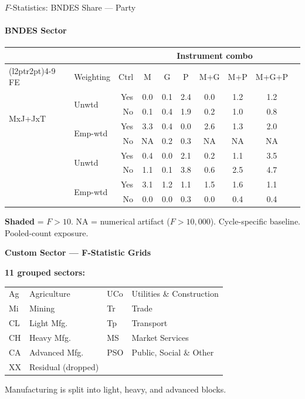 \documentclass[aspectratio=169,10pt]{beamer}
\begin{document}
\begin{frame}[t]{$F$-Statistics: BNDES Share --- Party}
\framesubtitle{BNDES Sector}
\begin{center}
\footnotesize
\setlength{\tabcolsep}{3.5pt}
\renewcommand{\arraystretch}{1.05}
\begin{tabular}{@{}llrccccccc@{}}
\toprule
 & & & \multicolumn{6}{c}{Instrument combo} \\
\cmidrule(l{2pt}r{2pt}){4-9}
FE & Weighting & Ctrl & M & G & P & M+G & M+P & M+G+P \\
\midrule
  \multirow{4}{*}{MxJ+JxT} & \multirow{2}{*}{Unwtd} & Yes & 0.0 & 0.1 & 2.4 & 0.0 & 1.2 & 1.2 \\
   &  & No & 0.1 & 0.4 & 1.9 & 0.2 & 1.0 & 0.8 \\
   & \multirow{2}{*}{Emp-wtd} & Yes & 3.3 & 0.4 & 0.0 & 2.6 & 1.3 & 2.0 \\
   &  & No & NA & 0.2 & 0.3 & NA & NA & NA \\
\addlinespace[5pt]
  \multirow{4}{*}{MxJ+MxT} & \multirow{2}{*}{Unwtd} & Yes & 0.4 & 0.0 & 2.1 & 0.2 & 1.1 & 3.5 \\
   &  & No & 1.1 & 0.1 & 3.8 & 0.6 & 2.5 & 4.7 \\
   & \multirow{2}{*}{Emp-wtd} & Yes & 3.1 & 1.2 & 1.1 & 1.5 & 1.6 & 1.1 \\
   &  & No & 0.0 & 0.0 & 0.3 & 0.0 & 0.4 & 0.4 \\
\bottomrule
\end{tabular}
\end{center}
{\scriptsize \colorbox{pass}{\textbf{Shaded}} = $F>10$. NA = numerical artifact ($F>10{,}000$). Cycle-specific baseline. Pooled-count exposure.}
\end{frame}


\begin{frame}[plain]
\begin{center}
{\Large\textbf{Custom Sector --- F-Statistic Grids}}\\[0.5em]
\end{center}
\small
\textbf{11 grouped sectors:}\\[0.4em]
{\scriptsize
\renewcommand{\arraystretch}{1.08}
\begin{tabular}{@{}ll@{\hspace{1.3em}}ll@{}}
Ag & Agriculture & UCo & Utilities \& Construction \\
Mi & Mining & Tr & Trade \\
CL & Light Mfg. & Tp & Transport \\
CH & Heavy Mfg. & MS & Market Services \\
CA & Advanced Mfg. & PSO & Public, Social \& Other \\
XX & Residual (dropped) & & \\
\end{tabular}
\par}
\vspace{0.4em}
{\scriptsize Manufacturing is split into light, heavy, and advanced blocks.}
\vfill
\end{frame}
\end{document}
